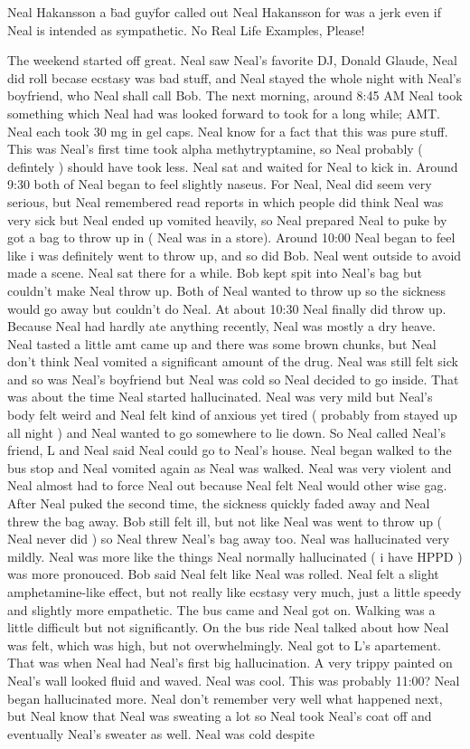 \documentclass[12pt]{book}
\begin{document}
Neal Hakansson a \"bad guy\" for called out Neal Hakansson for was a jerk even if Neal is intended as sympathetic. No Real Life Examples, Please!



The weekend started off great. Neal saw Neal's favorite DJ, Donald Glaude, Neal did roll becase ecstasy was bad stuff, and Neal stayed the whole night with Neal's boyfriend, who Neal shall call Bob. The next morning, around 8:45 AM Neal took something which Neal had was looked forward to took for a long while; AMT. Neal each took 30 mg in gel caps. Neal know for a fact that this was pure stuff. This was Neal's first time took alpha methytryptamine, so Neal probably ( defintely ) should have took less. Neal sat and waited for Neal to kick in. Around 9:30 both of Neal began to feel slightly naseus. For Neal, Neal did seem very serious, but Neal remembered read reports in which people did think Neal was very sick but Neal ended up vomited heavily, so Neal prepared Neal to puke by got a bag to throw up in ( Neal was in a store). Around 10:00 Neal began to feel like i was definitely went to throw up, and so did Bob. Neal went outside to avoid made a scene. Neal sat there for a while. Bob kept spit into Neal's bag but couldn't make Neal throw up. Both of Neal wanted to throw up so the sickness would go away but couldn't do Neal. At about 10:30 Neal finally did throw up. Because Neal had hardly ate anything recently, Neal was mostly a dry heave. Neal tasted a little amt came up and there was some brown chunks, but Neal don't think Neal vomited a significant amount of the drug. Neal was still felt sick and so was Neal's boyfriend but Neal was cold so Neal decided to go inside. That was about the time Neal started hallucinated. Neal was very mild but Neal's body felt weird and Neal felt kind of anxious yet tired ( probably from stayed up all night ) and Neal wanted to go somewhere to lie down. So Neal called Neal's friend, L and Neal said Neal could go to Neal's house. Neal began walked to the bus stop and Neal vomited again as Neal was walked. Neal was very violent and Neal almost had to force Neal out because Neal felt Neal would other wise gag. After Neal puked the second time, the sickness quickly faded away and Neal threw the bag away. Bob still felt ill, but not like Neal was went to throw up ( Neal never did ) so Neal threw Neal's bag away too. Neal was hallucinated very mildly. Neal was more like the things Neal normally hallucinated ( i have HPPD ) was more pronouced. Bob said Neal felt like Neal was rolled. Neal felt a slight amphetamine-like effect, but not really like ecstasy very much, just a little speedy and slightly more empathetic. The bus came and Neal got on. Walking was a little difficult but not significantly. On the bus ride Neal talked about how Neal was felt, which was high, but not overwhelmingly. Neal got to L's apartement. That was when Neal had Neal's first big hallucination. A very trippy painted on Neal's wall looked fluid and waved. Neal was cool. This was probably 11:00? Neal began hallucinated more. Neal don't remember very well what happened next, but Neal know that Neal was sweating a lot so Neal took Neal's coat off and eventually Neal's sweater as well. Neal was cold despite 
\end{document}
